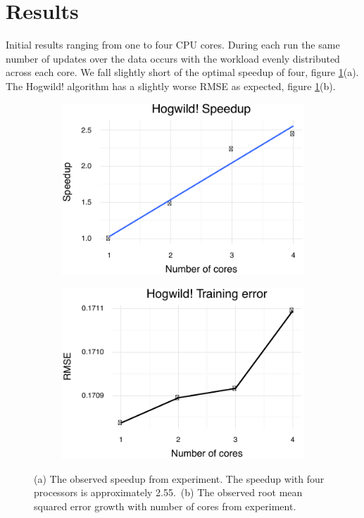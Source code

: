 \documentclass{article} %
\begin{document}
\section{Results}
Initial results ranging from one to four CPU cores. During each run the same number of updates over the data occurs with the workload evenly distributed across each core. We fall slightly short of the optimal speedup of four, figure \ref{res}(a). The Hogwild! algorithm has a slightly worse RMSE as expected, figure \ref{res}(b).
\begin{figure}[htb]
\centering
\begin{subfigure}{0.49\textwidth}
\includegraphics[width=\textwidth]{./speedup}
\end{subfigure}
\centering
\begin{subfigure}{0.49\textwidth}
\includegraphics[width=\textwidth]{./error}
\end{subfigure}
\caption{(a) The observed speedup from experiment. The speedup with four processors is approximately 2.55.~(b) The observed root mean squared error growth with number of cores from experiment.}
\label{res}
\end{figure}
\end{document}

